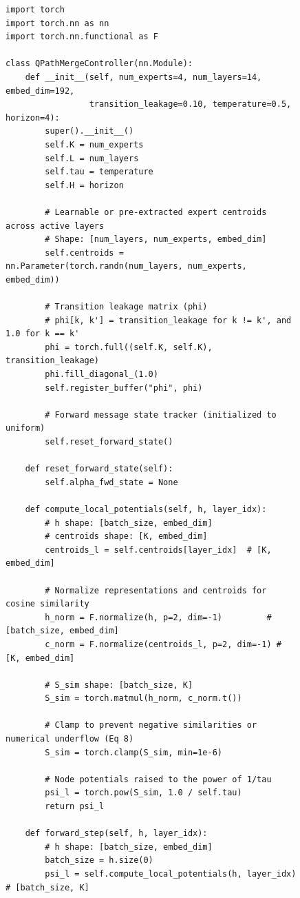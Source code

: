 \begin{figure}[h]
\centering
\begin{minipage}{0.95\textwidth}
\begin{verbatim}
import torch
import torch.nn as nn
import torch.nn.functional as F

class QPathMergeController(nn.Module):
    def __init__(self, num_experts=4, num_layers=14, embed_dim=192, 
                 transition_leakage=0.10, temperature=0.5, horizon=4):
        super().__init__()
        self.K = num_experts
        self.L = num_layers
        self.tau = temperature
        self.H = horizon
        
        # Learnable or pre-extracted expert centroids across active layers
        # Shape: [num_layers, num_experts, embed_dim]
        self.centroids = nn.Parameter(torch.randn(num_layers, num_experts, embed_dim))
        
        # Transition leakage matrix (phi)
        # phi[k, k'] = transition_leakage for k != k', and 1.0 for k == k'
        phi = torch.full((self.K, self.K), transition_leakage)
        phi.fill_diagonal_(1.0)
        self.register_buffer("phi", phi)
        
        # Forward message state tracker (initialized to uniform)
        self.reset_forward_state()

    def reset_forward_state(self):
        self.alpha_fwd_state = None

    def compute_local_potentials(self, h, layer_idx):
        # h shape: [batch_size, embed_dim]
        # centroids shape: [K, embed_dim]
        centroids_l = self.centroids[layer_idx]  # [K, embed_dim]
        
        # Normalize representations and centroids for cosine similarity
        h_norm = F.normalize(h, p=2, dim=-1)         # [batch_size, embed_dim]
        c_norm = F.normalize(centroids_l, p=2, dim=-1) # [K, embed_dim]
        
        # S_sim shape: [batch_size, K]
        S_sim = torch.matmul(h_norm, c_norm.t())
        
        # Clamp to prevent negative similarities or numerical underflow (Eq 8)
        S_sim = torch.clamp(S_sim, min=1e-6)
        
        # Node potentials raised to the power of 1/tau
        psi_l = torch.pow(S_sim, 1.0 / self.tau)
        return psi_l

    def forward_step(self, h, layer_idx):
        # h shape: [batch_size, embed_dim]
        batch_size = h.size(0)
        psi_l = self.compute_local_potentials(h, layer_idx) # [batch_size, K]
        

\end{verbatim}
\end{minipage}
\end{figure}
